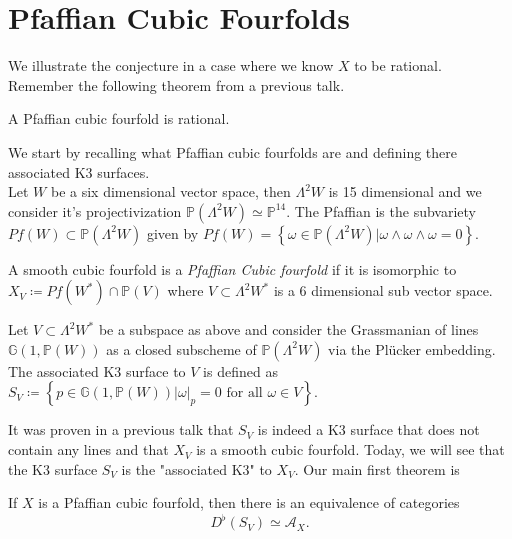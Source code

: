 \section{Pfaffian Cubic Fourfolds}
We illustrate the conjecture in a case where we know $X$ to be rational. 
Remember the following theorem from a previous talk.
\begin{thm}
	A Pfaffian cubic fourfold is rational.
\end{thm}
We start by recalling what Pfaffian cubic fourfolds are and defining there associated K3 surfaces.\\
Let $W$ be a six dimensional vector space, then $\Lambda^{2}W$ is 15 dimensional and we consider it's projectivization $\mathbb{P}( \Lambda^{2}W) \simeq \mathbb{P}^{14}$.
The Pfaffian is the subvariety $Pf( W) \subset \mathbb{P}( \Lambda^{2}W) $ given by $Pf( W) = \left\{ \omega \in \mathbb{P}( \Lambda ^{2}W) | \omega\wedge\omega\wedge\omega = 0 \right\} $.
\begin{defn}
	A smooth cubic fourfold is a \textit{Pfaffian Cubic fourfold} if it is isomorphic to $X_V \coloneq Pf( W^{\ast}) \cap \mathbb{P}( V) $ where $V \subset \Lambda^{2}W^{\ast}$ is a 6 dimensional sub vector space.
\end{defn}
\begin{defn}
	Let $V \subset \Lambda^{2}W^{\ast}$ be a subspace as above and consider the Grassmanian of lines $\mathbb{G}( 1, \mathbb{P}( W) ) $  as a closed subscheme of $\mathbb{P}( \Lambda^{2}W) $ via the Pl\"ucker embedding.
	The associated K3 surface to $V$  is defined as $S_V \coloneq \left\{ p \in \mathbb{G}( 1, \mathbb{P}( W) ) | \omega|_p = 0 \text{ for all } \omega \in V \right\}  $.
\end{defn}
It was proven in a previous talk that $S_V$ is indeed a K3 surface that does not contain any lines and that $X_V$ is a smooth cubic fourfold.
Today, we will see that the K3 surface $S_V$ is the "associated K3" to $X_V$.
Our main first theorem is
\begin{thm}
If $X$ is a Pfaffian cubic fourfold, then there is an equivalence of categories	
\[ 
D^{\flat}( S_V) \simeq \mathcal{A}_X.
\]
\end{thm}
